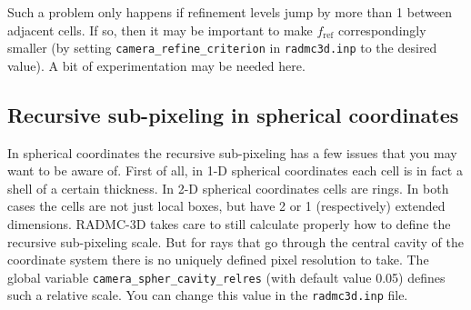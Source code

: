 \documentclass{report}
\begin{document}
Such a problem only happens if refinement levels jump by more than 1 between
adjacent cells. If so, then it may be important to make $f_{\mathrm{ref}}$
correspondingly smaller (by setting {\small\tt camera\_refine\_criterion} in
{\small\tt radmc3d.inp} to the desired value). A bit of experimentation may
be needed here.


\subsection{Recursive sub-pixeling in spherical coordinates}
\label{sec-rec-subpixel-spher-coord}
%
In spherical coordinates the recursive sub-pixeling has a few issues that
you may want to be aware of. First of all, in 1-D spherical coordinates each
cell is in fact a shell of a certain thickness. In 2-D spherical coordinates
cells are rings. In both cases the cells are not just local boxes, but have 
2 or 1 (respectively) extended dimensions. RADMC-3D takes care to still
calculate properly how to define the recursive sub-pixeling scale. But
for rays that go through the central cavity of the coordinate
system there is no uniquely defined pixel resolution to take. The
global variable {\small\tt camera\_spher\_cavity\_relres} (with default
value 0.05) defines such a relative scale. You can change this value
in the {\small\tt radmc3d.inp} file. 
\end{document}
